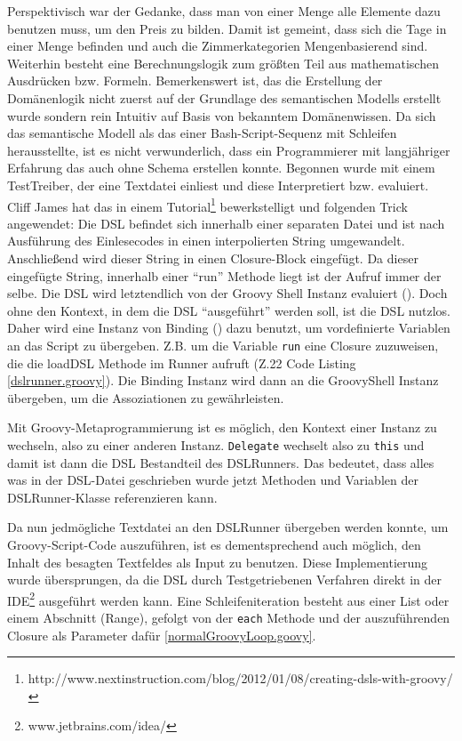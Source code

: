 \documentclass[11pt,english,ngerman, headsepline]{scrreprt}
\begin{document}
Perspektivisch war der Gedanke, dass man von einer Menge alle Elemente dazu
benutzen muss, um den Preis zu bilden. Damit ist gemeint, dass sich die Tage in
einer Menge befinden und auch die Zimmerkategorien Mengenbasierend sind.
Weiterhin besteht eine Berechnungslogik zum größten Teil aus mathematischen
Ausdrücken bzw. Formeln.
Bemerkenswert ist, das die Erstellung der Domänenlogik nicht zuerst auf der
Grundlage des semantischen Modells erstellt wurde sondern rein Intuitiv auf
Basis von bekanntem Domänenwissen. Da sich das semantische Modell als das einer
Bash-Script-Sequenz mit Schleifen herausstellte, ist es nicht verwunderlich,
dass ein Programmierer mit langjähriger Erfahrung das auch ohne Schema erstellen
konnte.
Begonnen wurde mit einem TestTreiber, der eine Textdatei einliest und diese
Interpretiert bzw. evaluiert.
Cliff James hat das in einem
Tutorial\footnote{http://www.nextinstruction.com/blog/2012/01/08/creating-dsls-with-groovy/}
bewerkstelligt und folgenden Trick angewendet:
Die DSL befindet sich innerhalb einer separaten Datei und ist nach Ausführung
des Einlesecodes in einen interpolierten String umgewandelt. Anschließend wird
dieser String in einen Closure-Block eingefügt.
Da dieser eingefügte String, innerhalb einer ``run'' Methode liegt ist der
Aufruf immer der selbe.
Die DSL wird letztendlich von der Groovy Shell Instanz evaluiert (\cite[S.
368]{koenig2007groovy}).
Doch ohne den Kontext, in dem die DSL ``ausgeführt'' werden soll, ist die DSL
nutzlos. Daher wird eine Instanz von Binding (\cite[S. 368]{koenig2007groovy})
dazu benutzt, um vordefinierte Variablen an das Script zu übergeben.
Z.B. um die Variable \texttt{run} eine Closure
zuzuweisen, die die loadDSL Methode im Runner aufruft (Z.22 Code Listing
\ref{dslrunner.groovy}). Die Binding Instanz wird dann an die GroovyShell
Instanz übergeben, um die Assoziationen zu gewährleisten.

Mit Groovy-Metaprogrammierung ist es möglich, den Kontext einer Instanz zu
wechseln, also zu einer anderen Instanz. \texttt{Delegate} wechselt also zu
\texttt{this} und damit ist dann die DSL Bestandteil des DSLRunners. Das
bedeutet, dass alles was in der DSL-Datei geschrieben wurde jetzt Methoden und
Variablen der DSLRunner-Klasse referenzieren kann.
 


Da nun jedmögliche Textdatei an den DSLRunner übergeben werden konnte, um
Groovy-Script-Code auszuführen, ist es dementsprechend auch möglich, den Inhalt
des besagten Textfeldes als Input zu benutzen. Diese Implementierung
wurde übersprungen, da die DSL durch Testgetriebenen Verfahren
\cite{beck2002driven} direkt in der IDE\footnote{www.jetbrains.com/idea/ }
ausgeführt werden kann.
 Eine Schleifeniteration besteht aus einer List oder
einem Abschnitt (Range), gefolgt von der \texttt{each} Methode und der
auszuführenden Closure als Parameter dafür \ref{normalGroovyLoop.goovy}.
\end{document}
